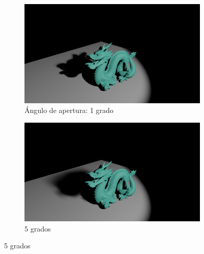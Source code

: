 \begin{figure}[H]
	\centering
	\begin{subfigure}[b]{.49\linewidth}
		\centering
		\captionsetup{justification=centering}
		\caption*{Ángulo de apertura: 1 grado}
		\includegraphics[width=\linewidth]{media/finals/shadow_1.png}
	\end{subfigure}%
	\hspace{0.01\textwidth}
	\begin{subfigure}[b]{.49\linewidth}
		\centering
		\captionsetup{justification=centering}
		\caption*{5 grados}
		\includegraphics[width=\linewidth]{media/finals/shadow_5.png}
	\end{subfigure}%
\end{figure}

